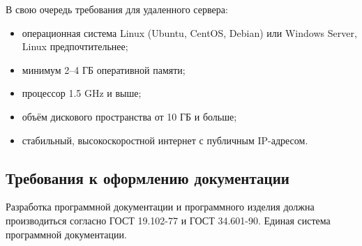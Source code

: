 В свою очередь требования для удаленного сервера:
\begin{itemize}
	\item операционная система Linux (Ubuntu, CentOS, Debian) или Windows Server, Linux предпочтительнее;
	\item минимум 2–4 ГБ оперативной памяти;
	\item процессор 1.5 GHz и выше;
	\item объём дискового пространства от 10 ГБ и больше;
	\item стабильный, высокоскоростной интернет с публичным IP-адресом.		
\end{itemize}
\subsection{Требования к оформлению документации}

Разработка программной документации и программного изделия должна производиться согласно ГОСТ 19.102-77 и ГОСТ 34.601-90. Единая система программной документации.